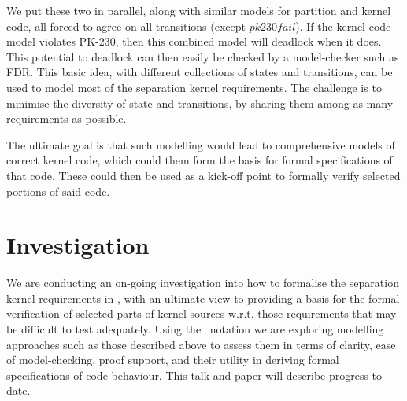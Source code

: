 We put these two in parallel, along with similar models for partition
and kernel code, all forced to agree on all transitions (except $pk230fail$).
If the kernel code model violates PK-230, then this combined model
will deadlock when it does.
This potential to deadlock can then easily be checked by a model-checker
such as FDR.
This basic idea, with different collections of states and transitions,
can be used to model most of the separation kernel requirements.
The challenge is to minimise the diversity of state and transitions,
by sharing them among as many requirements as possible.

The ultimate goal is that such modelling would lead to comprehensive models
of correct kernel code,
which could them form the basis for formal specifications of that code.
These could then be used as a kick-off point to formally verify selected
portions of said code.



\section{Investigation}

We are conducting an on-going investigation into how to formalise
the separation kernel requirements in \cite{IMAKQP-D02},
with an ultimate view to providing a basis for the formal verification
of selected parts of kernel sources w.r.t. those requirements that
may be difficult to test adequately.
Using the \Circus\ notation we are exploring modelling approaches
such as those described above
to assess them in terms of clarity, ease of model-checking, proof support,
and their utility in deriving formal specifications of code behaviour.
This talk and paper will describe progress to date.
